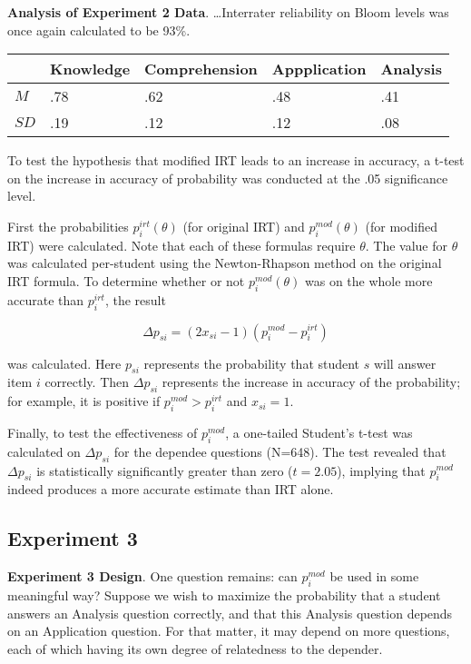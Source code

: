 \documentclass[]{interact}
\theoremstyle{plain}
\theoremstyle{definition}
\theoremstyle{remark}
\begin{document}
\textbf{Analysis of Experiment 2 Data}. \ldots Interrater reliability on Bloom
levels was once again calculated to be 93\%. 

\begin{center}
\begin{tabular}{|l|l|l|l|l|}
                                                                 \hline
      &   Knowledge & Comprehension & Appplication & Analysis \\ \hline
 $M$  &  .78 & .62 & .48 & .41  \\ \hline
$SD$  &  .19 & .12 & .12 & .08  \\ \hline
\end{tabular}
\end{center}

To test the hypothesis that modified IRT leads to an increase in accuracy,
a t-test on the increase in accuracy of probability was conducted at the
.05 significance level.

First the probabilities $p_i^{irt}(\theta)$ (for original IRT) and
$p_i^{mod}(\theta)$ (for modified IRT) were calculated.  Note that each of
these formulas require $\theta$. The value for $\theta$ was calculated
per-student using the Newton-Rhapson method on the original IRT formula.  To
determine whether or not $p_i^{mod}(\theta)$ was on the whole more accurate
than $p_i^{irt}$, the result

\[
  \Delta p_{si} = (2x_{si}-1) (p_i^{mod} - p_i^{irt})
\]

was calculated. Here $p_{si}$ represents the probability that student $s$ will
answer item $i$ correctly.  Then $\Delta p_{si}$ represents the increase in
accuracy of the probability; for example, it is positive if $p_i^{mod} >
p_i^{irt}$ and $x_{si} = 1$.

Finally, to test the effectiveness of $p_i^{mod}$, a one-tailed Student's
t-test was calculated on $\Delta p_{si}$ for the dependee questions (N=648).
The test revealed that $\Delta p_{si}$ is statistically significantly greater
than zero ($t=2.05$), implying that $p_i^{mod}$ indeed produces a more accurate
estimate than IRT alone. 

\subsection{Experiment 3}

\textbf{Experiment 3 Design}.  One question remains: can $p_i^{mod}$ be used in
some meaningful way?  Suppose we wish to maximize the probability that a
student answers an Analysis question correctly, and that this Analysis question
depends on an Application question.  For that matter, it may depend on more
questions, each of which having its own degree of relatedness to the depender.
\end{document}
